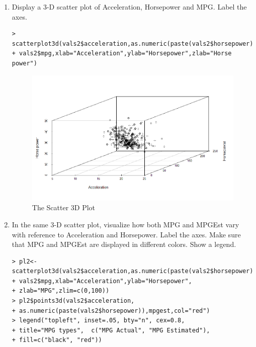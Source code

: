 \documentclass[fontsize=10pt]{scrartcl}
\begin{document}
\begin{enumerate}
		\begin{enumerate}
			\item
			Display a 3-D scatter plot of Acceleration, Horsepower and MPG. Label the axes. \\
\begin{verbatim}
> scatterplot3d(vals2$acceleration,as.numeric(paste(vals2$horsepower)),
+ vals2$mpg,xlab="Acceleration",ylab="Horsepower",zlab="Horse power")
\end{verbatim}
			\begin{figure}[H]
				\begin{center}
					\includegraphics[scale=.5]{resources/scatter3d.png}
					\caption{The Scatter 3D Plot}
				\end{center}
			\end{figure}

			\item
			In the same 3-D scatter plot, visualize how both MPG and MPGEst vary with reference to Acceleration and Horsepower. Label the axes. Make sure that MPG and MPGEst are displayed in different colors. Show a legend.
\begin{verbatim}
> pl2<-scatterplot3d(vals2$acceleration,as.numeric(paste(vals2$horsepower),
+ vals2$mpg,xlab="Acceleration",ylab="Horsepower",
+ zlab="MPG",zlim=c(0,100))
> pl2$points3d(vals2$acceleration,
+ as.numeric(paste(vals2$horsepower)),mpgest,col="red")
> legend("topleft", inset=.05, bty="n", cex=0.8, 
+ title="MPG types",  c("MPG Actual", "MPG Estimated"), 
+ fill=c("black", "red"))
\end{verbatim}
			

\end{enumerate}
\end{enumerate}
\end{document}

